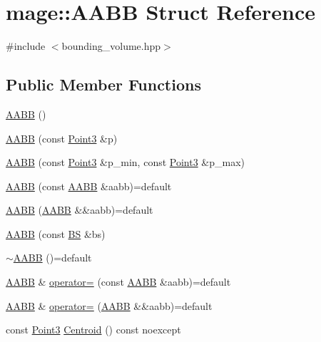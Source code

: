 \hypertarget{structmage_1_1_a_a_b_b}{}\section{mage\+:\+:A\+A\+BB Struct Reference}
\label{structmage_1_1_a_a_b_b}


{\ttfamily \#include $<$bounding\+\_\+volume.\+hpp$>$}

\subsection*{Public Member Functions}
\begin{DoxyCompactItemize}
\item 
\hyperlink{structmage_1_1_a_a_b_b_ae6db94dcb9165eb008f0be8741f0eb62}{A\+A\+BB} ()
\item 
\hyperlink{structmage_1_1_a_a_b_b_a03a5ca9571075c5e12c5e7a4a38913bf}{A\+A\+BB} (const \hyperlink{structmage_1_1_point3}{Point3} \&p)
\item 
\hyperlink{structmage_1_1_a_a_b_b_aff9e36907c435c74cc948a13cc9f1222}{A\+A\+BB} (const \hyperlink{structmage_1_1_point3}{Point3} \&p\+\_\+min, const \hyperlink{structmage_1_1_point3}{Point3} \&p\+\_\+max)
\item 
\hyperlink{structmage_1_1_a_a_b_b_a07266c753cdfda4129ece8d605714e08}{A\+A\+BB} (const \hyperlink{structmage_1_1_a_a_b_b}{A\+A\+BB} \&aabb)=default
\item 
\hyperlink{structmage_1_1_a_a_b_b_a4de1911a46f6c2603ddba3c3348233f1}{A\+A\+BB} (\hyperlink{structmage_1_1_a_a_b_b}{A\+A\+BB} \&\&aabb)=default
\item 
\hyperlink{structmage_1_1_a_a_b_b_a2be79f65a33fa973ca0b71570d96b7cc}{A\+A\+BB} (const \hyperlink{structmage_1_1_b_s}{BS} \&bs)
\item 
\hyperlink{structmage_1_1_a_a_b_b_a0fa31372f7488cb30b886c77bd676f17}{$\sim$\+A\+A\+BB} ()=default
\item 
\hyperlink{structmage_1_1_a_a_b_b}{A\+A\+BB} \& \hyperlink{structmage_1_1_a_a_b_b_a5366c42bc506842e4c58a941c4a08f43}{operator=} (const \hyperlink{structmage_1_1_a_a_b_b}{A\+A\+BB} \&aabb)=default
\item 
\hyperlink{structmage_1_1_a_a_b_b}{A\+A\+BB} \& \hyperlink{structmage_1_1_a_a_b_b_a5ca72f9aabc219cd598af6eab6b8b99f}{operator=} (\hyperlink{structmage_1_1_a_a_b_b}{A\+A\+BB} \&\&aabb)=default
\item 
const \hyperlink{structmage_1_1_point3}{Point3} \hyperlink{structmage_1_1_a_a_b_b_ab55cbe6917b4a69b7f87c65b5c879ef1}{Centroid} () const noexcept

\end{DoxyCompactItemize}
